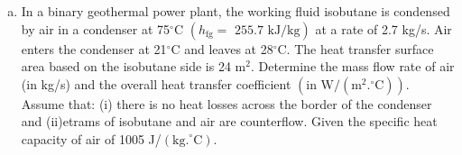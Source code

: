 \documentclass[calculator,datasheet,handbook,solutions]{exam}
\begin{document}

\begin{question}
  \begin{enumerate}[a)]
     \item In a binary geothermal power plant, the working fluid isobutane is condensed by air in a condenser at 75$^{\circ}$C $\left(h_{\text{fg}}=\text{ 255.7 kJ/kg}\right)$ at a rate of 2.7 kg/s. Air enters the condenser at 21$^{\circ}$C and leaves at 28$^{\circ}$C. The heat transfer surface area based on the isobutane side is 24 m$^{2}$. Determine the mass flow rate of air (in kg/s) and the overall heat transfer coefficient $\left(\text{in W/}\left(\text{m}^{2}.^{\circ}\text{C}\right)\right)$. Assume that: (i) there is no heat losses across the border of the condenser and (ii)etrams of isobutane and air are counterflow. Given the specific heat capacity of air of 1005 J/$\left(\text{kg.}^{\circ}\text{C}\right)$.
\end{enumerate}
\end{question}
\end{document}
